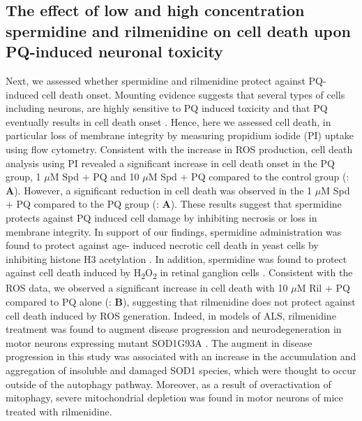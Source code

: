 \subsection{The effect of low and high concentration spermidine and rilmenidine on cell death upon PQ-induced neuronal toxicity}
Next, we assessed whether spermidine and rilmenidine protect against PQ-induced cell death onset. Mounting evidence suggests that several types of cells including neurons, are highly sensitive to PQ induced toxicity and that PQ eventually results in cell death onset \citep{Chun2001,Gonzalez-Polo2004,Niso-Santano2006}. Hence, here we assessed cell death, in particular loss of membrane integrity by measuring propidium iodide (PI) uptake using flow cytometry. Consistent with the increase in ROS production, cell death analysis using PI revealed a significant increase in cell death onset in the PQ group, 1 $\mu$M Spd + PQ and 10 $\mu$M Spd + PQ compared to the control group (: \textbf{A}). However, a significant reduction in cell death was observed in the 1 $\mu$M Spd + PQ compared to the PQ group (: \textbf{A}). These results suggest that spermidine protects against PQ induced cell damage by inhibiting necrosis or loss in membrane integrity. In support of our findings, spermidine administration was found to protect against age- induced necrotic cell death in yeast cells by inhibiting histone H3 acetylation \citep{Eisenberg2009}. In addition, spermidine was found to protect against cell death induced by H\textsubscript{2}O\textsubscript{2} in retinal ganglion cells \citep{Guo2011}. Consistent with the ROS data, we observed a significant increase in cell death with 10 $\mu$M Ril + PQ compared to PQ alone (: \textbf{B}), suggesting that rilmenidine does not protect against cell death induced by ROS generation. Indeed, in models of ALS, rilmenidine treatment was found to augment disease progression and neurodegeneration in motor neurons expressing mutant SOD1G93A \citep{Perera2018}. The augment in disease progression in this study was associated with an increase in the accumulation and aggregation of insoluble and damaged SOD1 species, which were thought to occur outside of the autophagy pathway. Moreover, as a result of overactivation of mitophagy, severe mitochondrial depletion was found in motor neurons of mice treated with rilmenidine.

